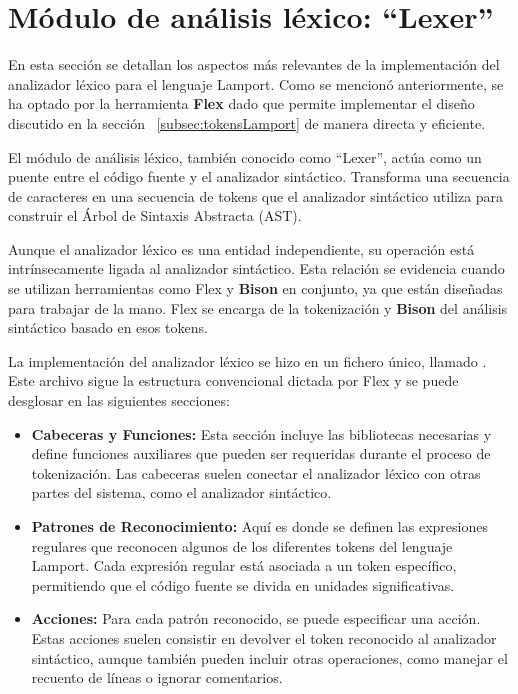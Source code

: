 \section{Módulo de análisis léxico: ``Lexer''}\label{sec:implementacionLexer}

En esta sección se detallan los aspectos más relevantes de la implementación del analizador léxico para el lenguaje Lamport. Como se mencionó anteriormente, se ha optado por la herramienta \textbf{Flex} dado que permite implementar el diseño discutido en la sección ~\ref{subsec:tokensLamport} de manera directa y eficiente.

\vspace{0.5cm}

El módulo de análisis léxico, también conocido como ``Lexer'', actúa como un puente entre el código fuente y el analizador sintáctico. Transforma una secuencia de caracteres en una secuencia de tokens que el analizador sintáctico utiliza para construir el Árbol de Sintaxis Abstracta (AST).

\vspace{0.5cm}

Aunque el analizador léxico es una entidad independiente, su operación está intrínsecamente ligada al analizador sintáctico. Esta relación se evidencia cuando se utilizan herramientas como Flex y \textbf{Bison} en conjunto, ya que están diseñadas para trabajar de la mano. Flex se encarga de la tokenización y \textbf{Bison} del análisis sintáctico basado en esos tokens.

\vspace{0.5cm}

La implementación del analizador léxico se hizo en un fichero único, llamado . Este archivo sigue la estructura convencional dictada por Flex y se puede desglosar en las siguientes secciones:

\begin{itemize}
    \item \textbf{Cabeceras y Funciones:} Esta sección incluye las bibliotecas necesarias y define funciones auxiliares que pueden ser requeridas durante el proceso de tokenización. Las cabeceras suelen conectar el analizador léxico con otras partes del sistema, como el analizador sintáctico.
    
    \item \textbf{Patrones de Reconocimiento:} Aquí es donde se definen las expresiones regulares que reconocen algunos de los diferentes tokens del lenguaje Lamport. Cada expresión regular está asociada a un token específico, permitiendo que el código fuente se divida en unidades significativas.
    \item \textbf{Acciones:} Para cada patrón reconocido, se puede especificar una acción. Estas acciones suelen consistir en devolver el token reconocido al analizador sintáctico, aunque también pueden incluir otras operaciones, como manejar el recuento de líneas o ignorar comentarios.
\end{itemize}

